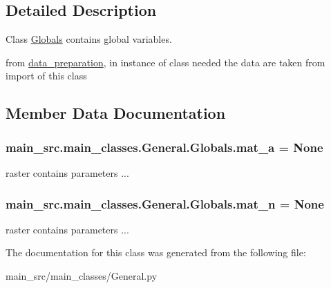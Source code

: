 \subsection{Detailed Description}
Class \hyperlink{classmain__src_1_1main__classes_1_1General_1_1Globals}{Globals} contains global variables. 

from \hyperlink{namespacemain__src_1_1data__preparation}{data\-\_\-preparation}, in instance of class needed the data are taken from import of this class 

\subsection{Member Data Documentation}
\hypertarget{classmain__src_1_1main__classes_1_1General_1_1Globals_a9cbbbf4267953fdd0d4d0d4efbaad3e3}{
\subsubsection[{mat\-\_\-a}]{\setlength{\rightskip}{0pt plus 5cm}main\-\_\-src.\-main\-\_\-classes.\-General.\-Globals.\-mat\-\_\-a = None\hspace{0.3cm}{\ttfamily [static]}}}\label{classmain__src_1_1main__classes_1_1General_1_1Globals_a9cbbbf4267953fdd0d4d0d4efbaad3e3}


raster contains parameters ... 

\hypertarget{classmain__src_1_1main__classes_1_1General_1_1Globals_a5a4437ae6659f1c2086d13eb24a47dd9}{
\subsubsection[{mat\-\_\-n}]{\setlength{\rightskip}{0pt plus 5cm}main\-\_\-src.\-main\-\_\-classes.\-General.\-Globals.\-mat\-\_\-n = None\hspace{0.3cm}{\ttfamily [static]}}}\label{classmain__src_1_1main__classes_1_1General_1_1Globals_a5a4437ae6659f1c2086d13eb24a47dd9}


raster contains parameters ... 



The documentation for this class was generated from the following file\-:\begin{DoxyCompactItemize}
\item 
main\-\_\-src/main\-\_\-classes/General.\-py\end{DoxyCompactItemize}
